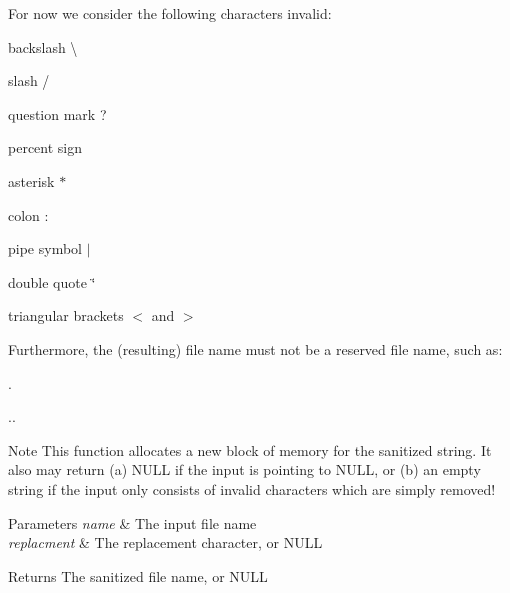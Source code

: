 For now we consider the following characters invalid\+:
\begin{DoxyItemize}
\item backslash \textquotesingle{}\textbackslash{}\textquotesingle{}
\item slash \textquotesingle{}/\textquotesingle{}
\item question mark \textquotesingle{}?\textquotesingle{}
\item percent sign \textquotesingle{}\textquotesingle{}
\item asterisk \textquotesingle{}$\ast$\textquotesingle{}
\item colon \textquotesingle{}\+:\textquotesingle{}
\item pipe symbol \textquotesingle{}$\vert$\textquotesingle{}
\item double quote \textquotesingle{}\char`\"{}\textquotesingle{}
\item triangular brackets \textquotesingle{}$<$\textquotesingle{} and \textquotesingle{}$>$\textquotesingle{}
\end{DoxyItemize}

Furthermore, the (resulting) file name must not be a reserved file name, such as\+:
\begin{DoxyItemize}
\item \textquotesingle{}.\textquotesingle{}
\item \textquotesingle{}..\textquotesingle{}
\end{DoxyItemize}

\begin{DoxyNote}{Note}
This function allocates a new block of memory for the sanitized string. It also may return (a) N\+U\+LL if the input is pointing to N\+U\+LL, or (b) an empty string if the input only consists of invalid characters which are simply removed!
\end{DoxyNote}

\begin{DoxyParams}{Parameters}
{\em name} & The input file name \\
\hline
{\em replacment} & The replacement character, or N\+U\+LL \\
\hline
\end{DoxyParams}
\begin{DoxyReturn}{Returns}
The sanitized file name, or N\+U\+LL 
\end{DoxyReturn}
\mbox{\label{group__file__utils_ga5e125c9586fcd4e2e1559fe76f7289cc}} 

